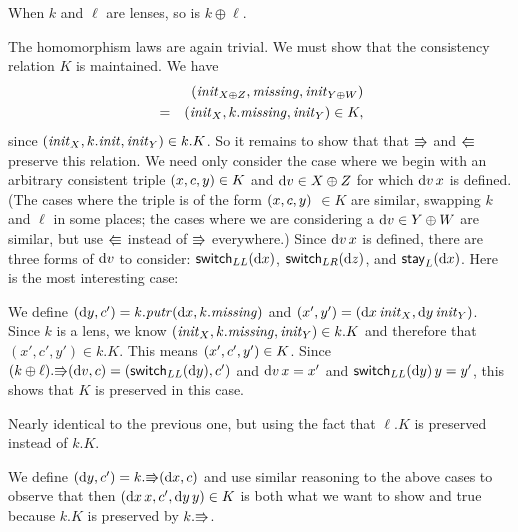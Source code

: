 \begin{theorem}
    When $k$ and $\ell$ are lenses, so is $k \oplus \ell$.
    \label{goodlens:tensor_sum}
\end{theorem}
\begin{pf}
The homomorphism laws are again trivial.  
We must show that the consistency relation $K$ is maintained. We have
\begin{eqnarray*}
&& (\mathit{init}_{X \oplus Z},\mathit{missing},\mathit{init}_{Y \oplus
W}) \\ & = & ({\mathit{init}_X},{k.\mathit{missing}},{\mathit{init}_Y}) \in K,
\end{eqnarray*}
since
$(\mathit{init}_X,k.\mathit{init},\mathit{init}_Y) \in k.K$.  So it remains to show that that
$\mathord{\Rrightarrow}$ and $\mathord{\Lleftarrow}$ preserve this relation. We need only consider 
the case where we begin with an arbitrary consistent triple
$( x, c, y) \in K$ and $\textrm{d} v \in X \oplus Z$ for which
$\textrm{d} v\, x$ is defined. (The cases where the triple is of the form
$( x, c, y)$ $ \in K$ are similar, swapping $k$ and
$\ell$ in some places; the cases where we are considering a $\textrm{d} v \in Y
\oplus W$ are similar, but use $\mathord{\Lleftarrow}$ instead of $\mathord{\Rrightarrow}$ everywhere.)
Since $\textrm{d} v\, x$ is defined, there are three forms of $\textrm{d} v$ to consider:
$\mathsf{switch}_{LL}(\textrm{d} x)$, $\mathsf{switch}_{LR}(\textrm{d} z)$, and $\mathsf{stay}_L(\textrm{d} x)$. \iffull\else Here is the
most interesting case:\fi
\begin{trivlist} 
\nextcase{$\dv=\mlswitchll\dx$} We define $(\textrm{d} y,c') =
    k.\mathit{putr}(\textrm{d} x,k.\mathit{missing})$ and $(x',y')=(\textrm{d} x\,\mathit{init}_X,\textrm{d} y\,\mathit{init}_Y)$.
    Since $k$ is a lens, we know $(\mathit{init}_X,k.\mathit{missing},\mathit{init}_Y) \in k.K$ and
    therefore that $(x',c',y') \in k.K$. This means
    $({x'},{c'},{y'}) \in K$. Since
    $(k\oplus\ell).\mathord{\Rrightarrow}(\textrm{d} v, c)=(\mathsf{switch}_{LL}(\textrm{d} y),{c'})$ and
    $\textrm{d} v\, x = {x'}$ and $\mathsf{switch}_{LL}(\textrm{d} y)\, y =
    {y'}$, this shows that $K$ is preserved in this case.
\iffull

\nextcase{$\dv=\mlswitchlr\dz$} Nearly identical to the previous one, but
    using the fact that $\ell.K$ is preserved instead of $k.K$.

\nextcase{$\dv=\mlstayl\dx$} We define $(\textrm{d} y,c') = k.\mathord{\Rrightarrow}(\textrm{d} x,c)$ and use
    similar reasoning to the above cases to observe that then
    $({\textrm{d} x\,x},{c'},{\textrm{d} y\,y}) \in K$ is both what we want
    to show and true because $k.K$ is preserved by $k.\mathord{\Rrightarrow}$.
\fi
    \endofpf
\end{trivlist}
\end{pf}


